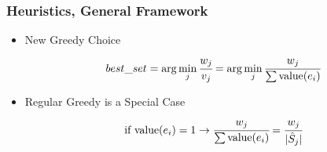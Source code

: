 \documentclass[xcolor=dvipsnames]{beamer}
\begin{document}
\begin{frame}
\frametitle{Heuristics, General Framework}
\begin{minipage}{0.30\textwidth}
\begin{overlayarea}{\textwidth}{0.5\textheight}
% 
\end{overlayarea}%
\end{minipage}%
\begin{minipage}{0.70\textwidth} 
\begin{itemize}
\item<1-> New Greedy Choice 
$$ best\_set = \arg \min_{j} \cfrac{w_j}{v_j} = \arg \min_{j} \cfrac{w_j}{\sum \text{value}(e_i)} $$
\item<2> Regular Greedy is a Special Case
 $$ \text{if value}(e_i) = 1 \rightarrow \cfrac{w_j}{\sum\text{value}(e_i)} = \cfrac{w_j}{|\hat{S}_j|}$$
\end{itemize}
\end{minipage}
\end{frame}
\end{document}
